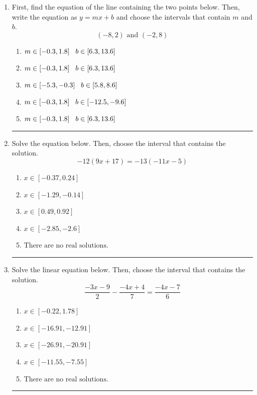 \documentclass[14pt]{extbook}
\newcommand{\litem}[1]{\item#1\hspace*{-1cm}\rule{\textwidth}{0.4pt}}
\begin{document}
\begin{enumerate}
{\begin{enumerate}[label=\Alph*.]
\end{enumerate} }
\litem{
First, find the equation of the line containing the two points below. Then, write the equation as $ y=mx+b $ and choose the intervals that contain $m$ and $b$.\[ (-8, 2) \text{ and } (-2, 8) \]\begin{enumerate}[label=\Alph*.]
\item \( m \in [-0.3, 1.8] \hspace*{3mm} b \in [6.3, 13.6] \)
\item \( m \in [-0.3, 1.8] \hspace*{3mm} b \in [6.3, 13.6] \)
\item \( m \in [-5.3, -0.3] \hspace*{3mm} b \in [5.8, 8.6] \)
\item \( m \in [-0.3, 1.8] \hspace*{3mm} b \in [-12.5, -9.6] \)
\item \( m \in [-0.3, 1.8] \hspace*{3mm} b \in [6.3, 13.6] \)

\end{enumerate} }
\litem{
Solve the equation below. Then, choose the interval that contains the solution.\[ -12(9x + 17) = -13(-11x -5) \]\begin{enumerate}[label=\Alph*.]
\item \( x \in [-0.37, 0.24] \)
\item \( x \in [-1.29, -0.14] \)
\item \( x \in [0.49, 0.92] \)
\item \( x \in [-2.85, -2.6] \)
\item \( \text{There are no real solutions.} \)

\end{enumerate} }
\litem{
Solve the linear equation below. Then, choose the interval that contains the solution.\[ \frac{-3x -9}{2} - \frac{-4x + 4}{7} = \frac{-4x -7}{6} \]\begin{enumerate}[label=\Alph*.]
\item \( x \in [-0.22, 1.78] \)
\item \( x \in [-16.91, -12.91] \)
\item \( x \in [-26.91, -20.91] \)
\item \( x \in [-11.55, -7.55] \)
\item \( \text{There are no real solutions.} \)


\end{enumerate}}
\end{enumerate}
\end{document}
